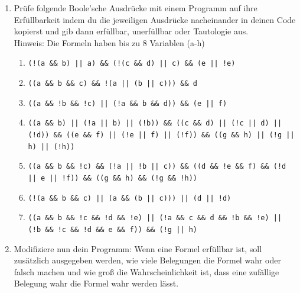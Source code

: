 \documentclass{../../sheet}
\begin{document}
\begin{enumerate}
    \item Prüfe folgende Boole'sche Ausdrücke mit einem Programm auf ihre Erfüllbarkeit indem du die jeweiligen Ausdrücke nacheinander in deinen Code kopierst und gib dann erfüllbar, unerfüllbar oder Tautologie aus.\\
    Hinweis: Die Formeln haben bis zu 8 Variablen (a-h)
          \begin{enumerate}
              \item \begin{ausgabe} \texttt{(!(a \&\& b) || a) \&\& (!(c \&\& d) || c) \&\& (e || !e)} \end{ausgabe} %
              \item \begin{ausgabe} \texttt{((a \&\& b \&\& c) \&\& !(a || (b || c))) \&\& d} \end{ausgabe} %
              \item \begin{ausgabe} \texttt{((a \&\& !b \&\& !c) || (!a \&\& b \&\& d)) \&\& (e || f)} \end{ausgabe} %
              \item \begin{ausgabe} \texttt{((a \&\& b) || (!a || b) || (!b)) \&\&
                            ((c \&\& d) || (!c || d) || (!d)) \&\&
                            ((e \&\& f) || (!e || f) || (!f)) \&\&
                            ((g \&\& h) || (!g || h) || (!h))}
                    \end{ausgabe} %
              \item \begin{ausgabe} \texttt{((a \&\& b \&\& !c) \&\& (!a || !b || c)) \&\&
                            ((d \&\& !e \&\& f) \&\& (!d || e || !f)) \&\&
                            ((g \&\& h) \&\& (!g \&\& !h))}
                    \end{ausgabe} %
              \item \begin{ausgabe} \texttt{(!(a \&\& b \&\& c) || (a \&\& (b || c))) || (d || !d)} \end{ausgabe} %
              \item \begin{ausgabe} \texttt{((a \&\& b \&\& !c \&\& !d \&\& !e) ||
                            (!a \&\& c \&\& d \&\& !b \&\& !e) ||
                            (!b \&\& !c \&\& !d \&\& e \&\& f)) \&\& (!g || h)}
                    \end{ausgabe} %
        \end{enumerate}
        \item Modifiziere nun dein Programm: Wenn eine Formel erfüllbar ist, soll zusätzlich ausgegeben werden, wie viele Belegungen die Formel wahr oder falsch machen und wie groß die Wahrscheinlichkeit ist, dass eine zufällige Belegung wahr die Formel wahr werden lässt.
    \end{enumerate}
\end{document}
